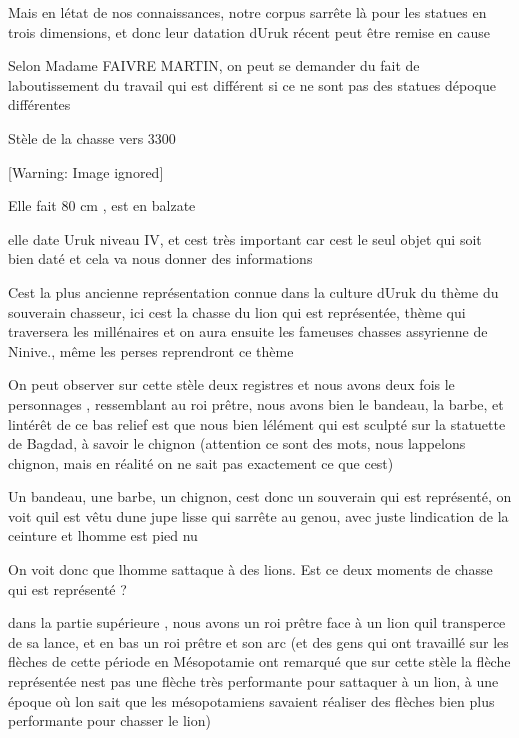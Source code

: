 \documentclass{article}
\begin{document}
Mais en l{\textquotesingle}état de nos connaissances, notre corpus
s{\textquotesingle}arrête là pour les statues en trois dimensions,  et
donc leur datation d{\textquotesingle}Uruk récent peut être remise en
cause 

Selon Madame FAIVRE MARTIN, on peut se demander du fait de
l{\textquotesingle}aboutissement du travail qui est différent si ce ne
sont pas des statues d{\textquotesingle}époque différentes

Stèle de la chasse vers 3300

  [Warning: Image ignored] %
 

Elle fait 80 cm , est en balzate

elle date Uruk niveau IV, et c{\textquotesingle}est très important car
c{\textquotesingle}est le seul objet qui soit bien daté et cela va nous
donner des informations

C{\textquotesingle}est la plus ancienne représentation connue dans la
culture d{\textquotesingle}Uruk du thème du souverain chasseur, ici
c{\textquotesingle}est la chasse du lion qui est représentée, thème qui
traversera les millénaires et on aura ensuite les fameuses chasses
assyrienne de Ninive., même les perses reprendront ce thème 

On peut observer sur cette stèle deux registres et nous avons deux fois
le personnages , ressemblant au roi prêtre, nous avons bien le bandeau,
la barbe, et l{\textquotesingle}intérêt de ce bas relief est que nous
bien l{\textquotesingle}élément qui est sculpté sur la statuette de
Bagdad, à savoir le chignon (attention ce sont des mots, nous
l{\textquotesingle}appelons chignon, mais en réalité on ne sait pas
exactement ce que c{\textquotesingle}est)

Un bandeau, une barbe, un chignon, c{\textquotesingle}est donc un
souverain qui est représenté, on voit qu{\textquotesingle}il est vêtu
d{\textquotesingle}une jupe lisse qui s{\textquotesingle}arrête au
genou, avec juste l{\textquotesingle}indication de la ceinture et
l{\textquotesingle}homme est pied nu

On voit donc que l{\textquotesingle}homme s{\textquotesingle}attaque à
des lions. Est ce deux moments de chasse qui est représenté ? 

dans la partie supérieure , nous avons un roi prêtre face à un lion
qu{\textquotesingle}il transperce de sa lance, et en bas un roi prêtre
et son arc (et des gens qui ont travaillé sur les flèches de cette
période en Mésopotamie ont remarqué que sur cette stèle la flèche
représentée n{\textquotesingle}est pas une flèche très performante pour
s{\textquotesingle}attaquer à un lion, à une époque où
l{\textquotesingle}on sait que les mésopotamiens savaient réaliser des
flèches bien plus performante pour chasser le lion)
\end{document}
